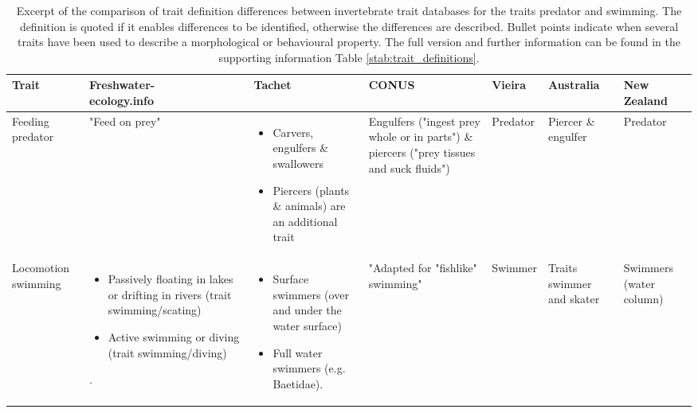 \documentclass[12pt]{article}
\makeatletter
\newcommand{\specialcell}[2][c]{%
  \begin{tabular}[#1]{@{}c@{}}#2\end{tabular}}
\makeatother
\begin{document}
\begin{landscape}
  \begin{longtable}{m{2.0cm}|m{4.0cm}|m{4.2cm}|m{4.2cm}|m{1.7cm}|m{2cm}|m{2.2cm}}
      \caption{Excerpt of the comparison of trait definition differences between invertebrate trait databases for the traits predator and swimming. The definition is quoted if it enables differences to be identified, otherwise the differences are described. Bullet points indicate when several traits have been used to describe a morphological or behavioural property. The full version and further information can be found in the supporting information Table \ref{stab:trait_definitions}.}
      \label{tab:trait_definitions}
      \endfirsthead
      \toprule[.1em]
      Trait & \specialcell{Freshwater- \\ ecology.info} & Tachet & CONUS & Vieira & Australia & \specialcell{New \\ Zealand} \\
      \toprule[.1em]
      Feeding predator & 
        "Feed on prey" & 
        \begin{itemize}
            \item Carvers, engulfers \& swallowers
            \item Piercers (plants \& animals) are an additional trait
        \end{itemize} & %
        Engulfers ("ingest prey whole or in parts") \& 
        piercers ("prey tissues and suck fluids") & 
        Predator &
        Piercer \& engulfer &
        Predator
        \\ 
        \midrule
        Locomotion swimming & 
        \begin{itemize}
            \item Passively floating  in lakes or drifting in rivers (trait swimming/scating)
            \item Active swimming or diving (trait swimming/diving)
        \end{itemize}. &
        \begin{itemize}
            \item Surface swimmers (over and under the water surface)
            \item Full water swimmers (e.g. Baetidae).
        \end{itemize} & 
        "Adapted for "fishlike" swimming" & 
        Swimmer & 
        Traits swimmer and skater & 
        Swimmers (water column)
        \\
      \bottomrule
  \end{longtable}
\end{landscape}
\end{document}
